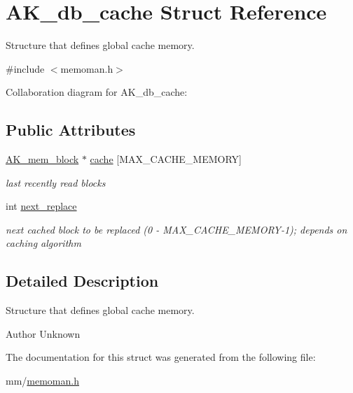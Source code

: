 \hypertarget{structAK__db__cache}{}\section{A\+K\+\_\+db\+\_\+cache Struct Reference}
\label{structAK__db__cache}


Structure that defines global cache memory.  




{\ttfamily \#include $<$memoman.\+h$>$}



Collaboration diagram for A\+K\+\_\+db\+\_\+cache\+:
\subsection*{Public Attributes}
\begin{DoxyCompactItemize}
\item 
\hyperlink{structAK__mem__block}{A\+K\+\_\+mem\+\_\+block} $\ast$ \hyperlink{structAK__db__cache_a77c58d95c53cc436131020502bdf9e9a}{cache} \mbox{[}M\+A\+X\+\_\+\+C\+A\+C\+H\+E\+\_\+\+M\+E\+M\+O\+RY\mbox{]}\hypertarget{structAK__db__cache_a77c58d95c53cc436131020502bdf9e9a}{}\label{structAK__db__cache_a77c58d95c53cc436131020502bdf9e9a}

\begin{DoxyCompactList}\small\item\em last recently read blocks \end{DoxyCompactList}\item 
int \hyperlink{structAK__db__cache_a8bade287ccc6bb581d0ad793d6438eb0}{next\+\_\+replace}\hypertarget{structAK__db__cache_a8bade287ccc6bb581d0ad793d6438eb0}{}\label{structAK__db__cache_a8bade287ccc6bb581d0ad793d6438eb0}

\begin{DoxyCompactList}\small\item\em next cached block to be replaced (0 -\/ M\+A\+X\+\_\+\+C\+A\+C\+H\+E\+\_\+\+M\+E\+M\+O\+R\+Y-\/1); depends on caching algorithm \end{DoxyCompactList}\end{DoxyCompactItemize}


\subsection{Detailed Description}
Structure that defines global cache memory. 

\begin{DoxyAuthor}{Author}
Unknown 
\end{DoxyAuthor}


The documentation for this struct was generated from the following file\+:\begin{DoxyCompactItemize}
\item 
mm/\hyperlink{memoman_8h}{memoman.\+h}\end{DoxyCompactItemize}
